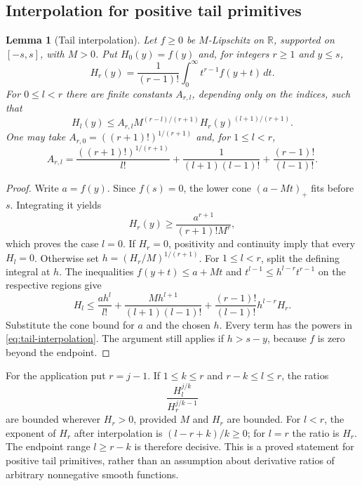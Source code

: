 \documentclass[11pt,letterpaper]{article}
\newtheorem{lemma}[theorem]{Lemma}
\theoremstyle{remark}\newtheorem{remark}[theorem]{Remark}
\newcommand{\R}{\mathbb R}\newcommand{\E}{\mathbb E}
\begin{document}
\subsection{Interpolation for positive tail primitives}

\begin{lemma}[Tail interpolation]\label{lem:tail-interpolation}
Let $f\ge0$ be $M$-Lipschitz on $\R$, supported on $[-s,s]$, with $M>0$. Put $H_0(y)=f(y)$ and, for integers $r\ge1$ and $y\le s$,
\[
H_r(y)=\frac1{(r-1)!}\int_0^\infty t^{r-1}f(y+t)\,dt.
\]
For $0\le l<r$ there are finite constants $A_{r,l}$, depending only on the indices, such that
\begin{equation}\label{eq:tail-interpolation}
H_l(y)\le A_{r,l}M^{(r-l)/(r+1)}H_r(y)^{(l+1)/(r+1)}.
\end{equation}
One may take $A_{r,0}=((r+1)!)^{1/(r+1)}$ and, for $1\le l<r$,
\[
A_{r,l}=\frac{((r+1)!)^{1/(r+1)}}{l!}
       +\frac1{(l+1)(l-1)!}+\frac{(r-1)!}{(l-1)!}.
\]
\end{lemma}
\begin{proof}
Write $a=f(y)$. Since $f(s)=0$, the lower cone $(a-Mt)_+$ fits before $s$. Integrating it yields
\[
H_r(y)\ge\frac{a^{r+1}}{(r+1)!M^r},
\]
which proves the case $l=0$. If $H_r=0$, positivity and continuity imply that every $H_l=0$. Otherwise set $h=(H_r/M)^{1/(r+1)}$. For $1\le l<r$, split the defining integral at $h$. The inequalities $f(y+t)\le a+Mt$ and $t^{l-1}\le h^{l-r}t^{r-1}$ on the respective regions give
\[
H_l\le\frac{ah^l}{l!}
       +\frac{Mh^{l+1}}{(l+1)(l-1)!}
       +\frac{(r-1)!}{(l-1)!}h^{l-r}H_r.
\]
Substitute the cone bound for $a$ and the chosen $h$. Every term has the powers in \eqref{eq:tail-interpolation}. The argument still applies if $h>s-y$, because $f$ is zero beyond the endpoint.
\end{proof}

For the application put $r=j-1$. If $1\le k\le r$ and $r-k\le l\le r$, the ratios
\begin{equation}\label{eq:weighted-primitives}
\frac{H_l^{j/k}}{H_r^{j/k-1}}
\end{equation}
are bounded wherever $H_r>0$, provided $M$ and $H_r$ are bounded. For $l<r$, the exponent of $H_r$ after interpolation is $(l-r+k)/k\ge0$; for $l=r$ the ratio is $H_r$. The endpoint range $l\ge r-k$ is therefore decisive. This is a proved statement for positive tail primitives, rather than an assumption about derivative ratios of arbitrary nonnegative smooth functions.
\end{document}
